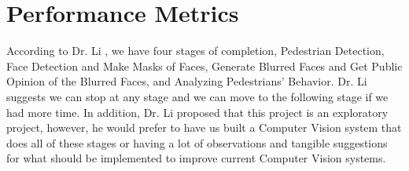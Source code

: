 \documentclass[onecolumn, draftclsnofoot,10pt, compsoc]{IEEEtran}
\begin{document}
\section{Performance Metrics}
According to Dr. Li \cite{li}, we have four stages of completion, Pedestrian Detection, Face Detection and Make Masks of Faces, Generate Blurred Faces and Get Public Opinion of the Blurred Faces, and Analyzing Pedestrians' Behavior. Dr. Li \cite{li} suggests we can stop at any stage and we can move to the following stage if we had more time. In addition, Dr. Li \cite{li} proposed that this project is an exploratory project, however, he would prefer to have us built a Computer Vision system that does all of these stages or having a lot of observations and tangible suggestions for what should be implemented to improve current Computer Vision systems.

  
  
\end{document}
